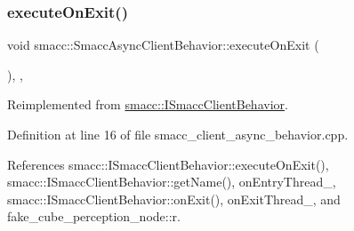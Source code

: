 \subsubsection{\texorpdfstring{execute\+On\+Exit()}{executeOnExit()}}
{\footnotesize\ttfamily void smacc\+::\+Smacc\+Async\+Client\+Behavior\+::execute\+On\+Exit (\begin{DoxyParamCaption}{ }\end{DoxyParamCaption})\hspace{0.3cm}{\ttfamily [override]}, {\ttfamily [protected]}, {\ttfamily [virtual]}}



Reimplemented from \hyperlink{classsmacc_1_1ISmaccClientBehavior_ac88fbad78c928b4bca6d18659ddfd8c0}{smacc\+::\+I\+Smacc\+Client\+Behavior}.



Definition at line 16 of file smacc\+\_\+client\+\_\+async\+\_\+behavior.\+cpp.



References smacc\+::\+I\+Smacc\+Client\+Behavior\+::execute\+On\+Exit(), smacc\+::\+I\+Smacc\+Client\+Behavior\+::get\+Name(), on\+Entry\+Thread\+\_\+, smacc\+::\+I\+Smacc\+Client\+Behavior\+::on\+Exit(), on\+Exit\+Thread\+\_\+, and fake\+\_\+cube\+\_\+perception\+\_\+node\+::r.


